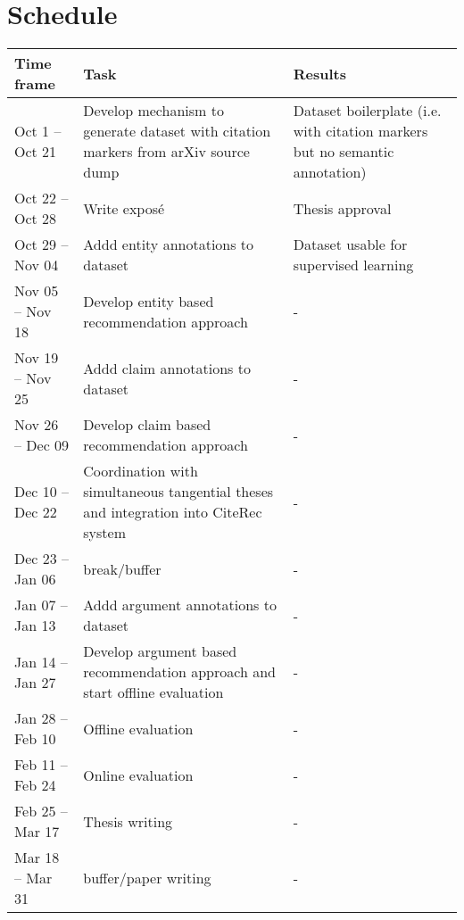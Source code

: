 \documentclass{proseminar}
\begin{document}
\section{Schedule}
\begin{table*}
\centering
\begin{tabular}{|p{2.5cm}|p{6cm}|p{4cm}|} \hline
Time frame&Task&Results\\ \hline
Oct 1 -- Oct 21 & Develop mechanism to generate dataset with citation markers from arXiv source dump & Dataset boilerplate (i.e. with citation markers but no semantic annotation)\\ \hline
Oct 22 -- Oct 28 & Write expos\'e  & Thesis approval\\ \hline
Oct 29 -- Nov 04 & Addd entity annotations to dataset & Dataset usable for supervised learning\\ \hline
Nov 05 -- Nov 18 & Develop entity based recommendation approach & -\\ \hline
Nov 19 -- Nov 25 & Addd claim annotations to dataset & -\\ \hline
Nov 26 -- Dec 09 & Develop claim based recommendation approach & -\\ \hline
Dec 10 -- Dec 22 & Coordination with simultaneous tangential theses and integration into CiteRec system & -\\ \hline
Dec 23 -- Jan 06 & break/buffer & -\\ \hline
Jan 07 -- Jan 13 & Addd argument annotations to dataset & -\\ \hline
Jan 14 -- Jan 27 & Develop argument based recommendation approach and start offline evaluation & -\\ \hline
Jan 28 -- Feb 10 & Offline evaluation & -\\ \hline
Feb 11 -- Feb 24 & Online evaluation & -\\ \hline
Feb 25 -- Mar 17 & Thesis writing & -\\ \hline
Mar 18 -- Mar 31 & buffer/paper writing & -\\ \hline\end{tabular}
\end{table*}
\end{document}
